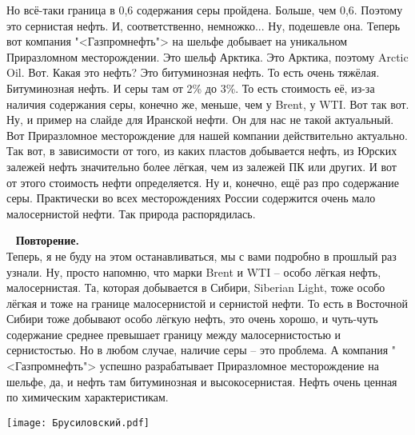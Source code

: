 \documentclass[main.tex]{subfiles}
\begin{document}
Но всё-таки граница в 0,6 содержания серы пройдена.
Больше, чем 0,6.
Поэтому это сернистая нефть.
И, соответственно, немножко...
Ну, подешевле она.
Теперь вот компания "<Газпромнефть"> на шельфе добывает на уникальном Приразломном месторождении.
Это шельф Арктика.
Это Арктика, поэтому Arctic Oil.
Вот. Какая это нефть?
Это битуминозная нефть.
То есть очень тяжёлая.
Битуминозная нефть.
И серы там от 2\% до 3\%.
То есть стоимость её, из-за наличия содержания серы, конечно же, меньше, чем у Brent, у WTI.
Вот так вот.
Ну, и пример на слайде для Иранской нефти.
Он для нас не такой актуальный.
Вот Приразломное месторождение для нашей компании действительно актуально.
Так вот, в зависимости от того, из каких пластов добывается нефть, из Юрских залежей нефть значительно более лёгкая, чем из залежей ПК или других.
И вот от этого стоимость нефти определяется.
Ну и, конечно, ещё раз про содержание серы.
Практически во всех месторождениях России содержится очень мало малосернистой нефти.
Так природа распорядилась.

\ \newline
\textbf{Повторение.}\\
Теперь, я не буду на этом останавливаться, мы с вами подробно в прошлый раз узнали.
Ну, просто напомню, что марки Brent и WTI -- особо лёгкая нефть, малосернистая.
Та, которая добывается в Сибири, Siberian Light, тоже особо лёгкая и тоже на границе малосернистой и сернистой нефти.
То есть в Восточной Сибири тоже добывают особо лёгкую нефть, это очень хорошо, и чуть-чуть содержание среднее превышает границу между малосернистостью и сернистостью.
Но в любом случае, наличие серы -- это проблема.
А компания "<Газпромнефть"> успешно разрабатывает Приразломное месторождение на шельфе, да, и нефть там битуминозная и высокосернистая.
Нефть очень ценная по химическим характеристикам.

\begin{center}
\texttt{[image: Брусиловский.pdf]}
\end{center}
\end{document}
